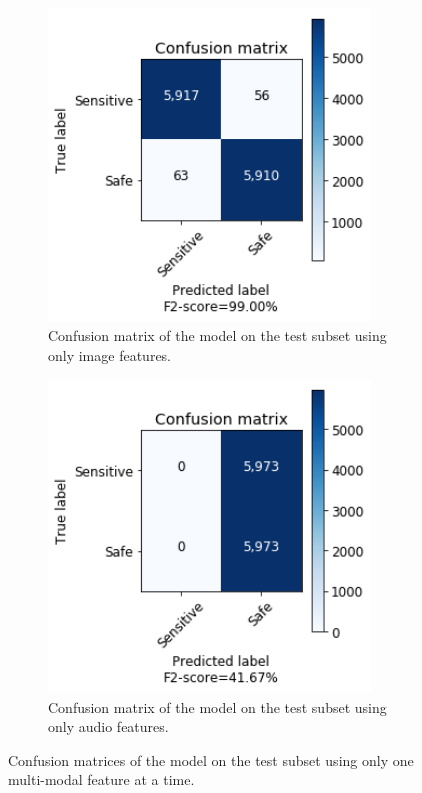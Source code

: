 \begin{figure}[!ht]
    \centering
    \begin{subfigure}[b]{0.49\textwidth}
        \includegraphics[width=0.94\textwidth]{img/results/MLP-TEST-IMAGE-ONLY.png}
        \caption{Confusion matrix of the model on the test subset using only image features.}
        \label{fig:cf-test-image}
    \end{subfigure}
    \begin{subfigure}[b]{0.49\textwidth}
        \includegraphics[width=0.94\textwidth]{img/results/MLP-TEST-AUDIO-ONLY.png}
        \caption{Confusion matrix of the model on the test subset using only audio features.}
        \label{fig:cf-test-audio}
    \end{subfigure}
    \caption{Confusion matrices of the model on the test subset using only one multi-modal feature at a time.}
\end{figure}

